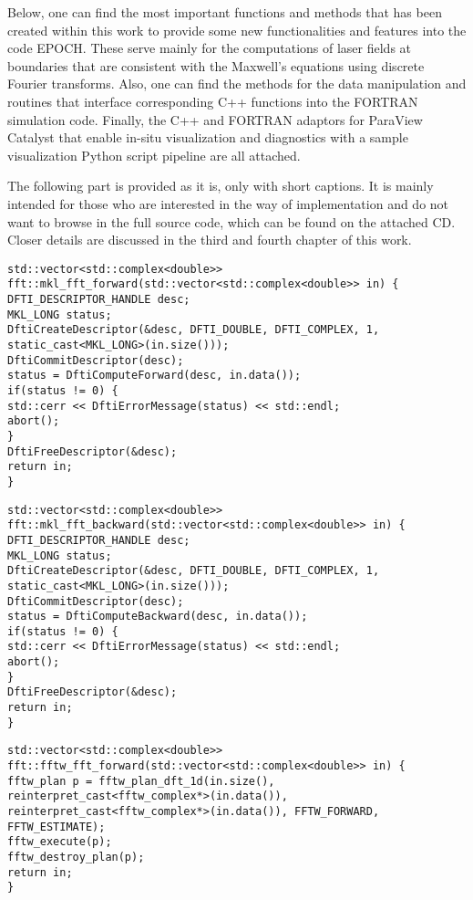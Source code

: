 Below, one can find the most important functions and methods that has been created within this work to provide some new functionalities and features into the code EPOCH. These serve mainly for the computations of laser fields at boundaries that are consistent with the Maxwell's equations using discrete Fourier transforms. Also, one can find the methods for the data manipulation and routines that interface corresponding C++ functions into the FORTRAN simulation code. Finally, the C++ and FORTRAN adaptors for ParaView Catalyst that enable in-situ visualization and diagnostics with a sample visualization Python script pipeline are all attached.

The following part is provided as it is, only with short captions. It is mainly intended for those who are interested in the way of implementation and do not want to browse in the full source code, which can be found on the attached CD. Closer details are discussed in the third and fourth chapter of this work.

\begin{lstlisting}[style=CXX, caption=Function performing forward fast Fourier transform using MKL library]
std::vector<std::complex<double>> fft::mkl_fft_forward(std::vector<std::complex<double>> in) {
DFTI_DESCRIPTOR_HANDLE desc;
MKL_LONG status;
DftiCreateDescriptor(&desc, DFTI_DOUBLE, DFTI_COMPLEX, 1, static_cast<MKL_LONG>(in.size()));
DftiCommitDescriptor(desc);
status = DftiComputeForward(desc, in.data());
if(status != 0) {
std::cerr << DftiErrorMessage(status) << std::endl;
abort();
}
DftiFreeDescriptor(&desc);
return in;
}
\end{lstlisting}

\begin{lstlisting}[style=CXX, caption=Function performing backward fast Fourier transform using MKL library]
std::vector<std::complex<double>> fft::mkl_fft_backward(std::vector<std::complex<double>> in) {
DFTI_DESCRIPTOR_HANDLE desc;
MKL_LONG status;
DftiCreateDescriptor(&desc, DFTI_DOUBLE, DFTI_COMPLEX, 1, static_cast<MKL_LONG>(in.size()));
DftiCommitDescriptor(desc);
status = DftiComputeBackward(desc, in.data());
if(status != 0) {
std::cerr << DftiErrorMessage(status) << std::endl;
abort();
}
DftiFreeDescriptor(&desc);
return in;
}
\end{lstlisting}

\begin{lstlisting}[style=CXX, caption=Function performing forward fast Fourier transform using FFTW library]
std::vector<std::complex<double>> fft::fftw_fft_forward(std::vector<std::complex<double>> in) {
fftw_plan p = fftw_plan_dft_1d(in.size(), reinterpret_cast<fftw_complex*>(in.data()), reinterpret_cast<fftw_complex*>(in.data()), FFTW_FORWARD, FFTW_ESTIMATE);
fftw_execute(p);
fftw_destroy_plan(p);
return in;
}
\end{lstlisting}

